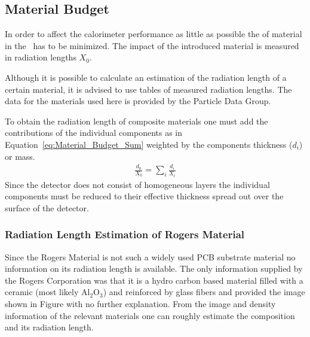 \documentclass[../BTOF_summary.tex]{subfiles}
\begin{document}
\subsection{Material Budget}
\label{sec:MaterialBudgetDesign}

In order to affect the calorimeter performance as little as possible the of material in the \btof\ has to be minimized.
The impact of the introduced material is measured in radiation lengths $X_0$.

Although it is possible to calculate an estimation of the radiation length of a certain material, it is advised to use tables of measured radiation lengths.%
The data for the materials used here is provided by the Particle Data Group.%

To obtain the radiation length of composite materials one must add the contributions of the individual components as in Equation~\eqref{eq:Material_Budget_Sum} weighted by the components thickness ($d_i$) or mass.%
\begin{align}\label{eq:Material_Budget_Sum}
	\frac{d_0}{X_0} = \sum_i \frac{d_i}{X_i}
\end{align}
Since the detector does not consist of homogeneous layers the individual components must be reduced to their effective thickness spread out over the surface of the detector.

\subsubsection*{Radiation Length Estimation of Rogers Material}

Since the Rogers Material is not such a widely used PCB substrate material no information on its radiation length is available.
The only information supplied by the Rogers Corporation was that it is a hydro carbon based material filled with a ceramic (most likely Al$_2$O$_3$) and reinforced by glass fibers and provided the image shown in Figure with no further explanation. 
From the image and density information of the relevant materials one can roughly estimate the composition and its radiation length. 
\end{document}
